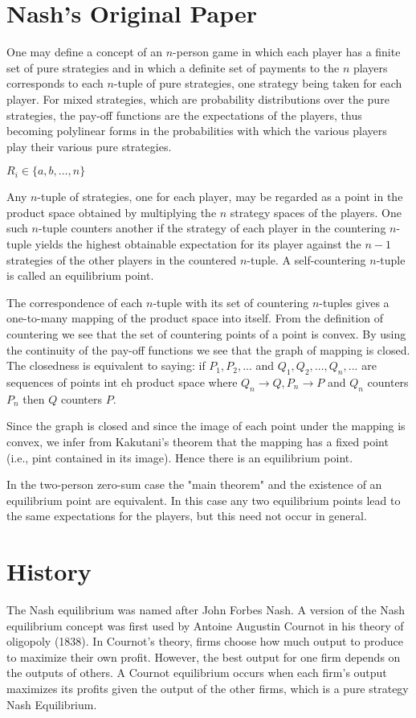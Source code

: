 \documentclass[twocolumn]{article}
\begin{document}
\section{Nash's Original Paper}
One may define a concept of an $n$-person game in which each player has a finite set of pure strategies and in which a definite set of payments to the $n$ players corresponds to each $n$-tuple of pure strategies, one strategy being taken for each player.           For mixed strategies, which are probability distributions over the pure strategies, the pay-off functions are the expectations of the players, thus becoming polylinear forms in the probabilities with which the various players play their various pure strategies.

$R_i \in \{ a, b, \dots, n\}$

Any $n$-tuple of strategies, one for each player, may be regarded as a point in the product space obtained by multiplying the $n$ strategy spaces of the players. One such $n$-tuple counters another if the strategy of each player in the countering $n$-tuple yields the highest obtainable expectation for its player against the $n-1$ strategies of the other players in the countered $n$-tuple. A self-countering $n$-tuple  is called an equilibrium point. 

The correspondence of each $n$-tuple with its set of countering $n$-tuples gives a one-to-many mapping of the product space into itself.
From the definition of countering  we see that the set of countering points of a point is convex. By using the continuity of the pay-off functions we see that the graph of mapping is closed. The closedness is equivalent to saying: if $P_1, P_2, ...$ and $Q_1, Q_2, ..., Q_n, ...$
are sequences of points int eh product space where $Q_n \rightarrow Q, P_n \rightarrow P$ and $Q_n$ counters $P_n$ then $Q$ counters $P$.

Since the graph is closed and since the image of each point under the mapping is convex, we infer from Kakutani's theorem that the mapping has a fixed point (i.e., pint contained in its image). Hence there is an equilibrium point.

In the two-person zero-sum case the "main theorem" and the existence of an equilibrium point are equivalent. In this case any two equilibrium points lead to the same expectations for the players, but this need not occur in general.

\section{History}
The Nash equilibrium was named after John Forbes Nash. A version of the Nash equilibrium concept was first used by Antoine Augustin Cournot in his theory of oligopoly (1838). In Cournot's theory, firms choose how much output to produce to maximize their own profit. However, the best output for one firm depends on the outputs of others. A Cournot equilibrium occurs when each firm's output maximizes its profits given the output of the other firms, which is a pure strategy Nash Equilibrium.
\end{document}
